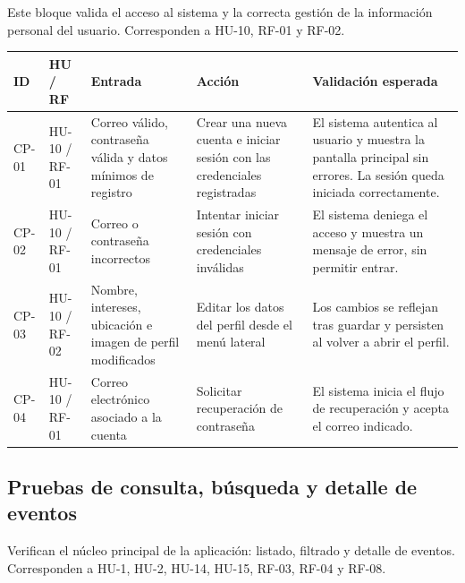 Este bloque valida el acceso al sistema y la correcta gestión de la información personal del usuario. Corresponden a HU-10, RF-01 y RF-02.

\begin{longtable}{|L{1.3cm}|L{1.6cm}|L{3cm}|L{3.8cm}|L{4.3cm}|}
\hline
\textbf{ID} & \textbf{HU / RF} & \textbf{Entrada} & \textbf{Acción} & \textbf{Validación esperada} \\
\hline
{}\label{cp:01}CP-01 & HU-10 / RF-01 & Correo válido, contraseña válida y datos mínimos de registro & Crear una nueva cuenta e iniciar sesión con las credenciales registradas & El sistema autentica al usuario y muestra la pantalla principal sin errores. La sesión queda iniciada correctamente. \\
\hline
{}\label{cp:02}CP-02 & HU-10 / RF-01 & Correo o contraseña incorrectos & Intentar iniciar sesión con credenciales inválidas & El sistema deniega el acceso y muestra un mensaje de error, sin permitir entrar. \\
\hline
{}\label{cp:03}CP-03 & HU-10 / RF-02 & Nombre, intereses, ubicación e imagen de perfil modificados & Editar los datos del perfil desde el menú lateral & Los cambios se reflejan tras guardar y persisten al volver a abrir el perfil. \\
\hline
{}\label{cp:04}CP-04 & HU-10 / RF-01 & Correo electrónico asociado a la cuenta & Solicitar recuperación de contraseña & El sistema inicia el flujo de recuperación y acepta el correo indicado. \\
\hline
\end{longtable}

\subsection{Pruebas de consulta, búsqueda y detalle de eventos}

Verifican el núcleo principal de la aplicación: listado, filtrado y detalle de eventos. Corresponden a HU-1, HU-2, HU-14, HU-15, RF-03, RF-04 y RF-08.

